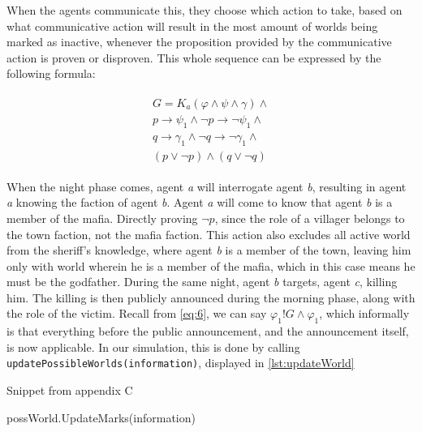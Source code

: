 When the agents communicate this, they choose which action to take, based on
what communicative action will result in the most amount of worlds being marked
as inactive, whenever the proposition provided by the communicative action is
proven or disproven. This whole sequence can be
expressed by the following formula:

\begin{align}
	\begin{split}
		G = K_a(\varphi \land \psi \land\gamma)\land                        \\
		p \rightarrow \psi_1 \land \neg p \rightarrow \neg \psi_1 \land     \\
		q \rightarrow \gamma_1 \land \neg q \rightarrow \neg \gamma_1 \land \\
		(p \lor \neg p) \land (q \lor \neg q)
		\label{eq:7}
	\end{split}
\end{align}

When the night phase comes, agent \textit{a} will interrogate agent \textit{b},
resulting in agent \textit{a} knowing the faction of agent \textit{b}. Agent
\textit{a} will come to know that agent \textit{b} is a member of the mafia.
Directly proving $\neg p$, since the role of a villager belongs to the town
faction, not the mafia faction. This action also excludes all active world from
the sheriff's knowledge, where agent \textit{b} is a member of the town,
leaving him only with world wherein he is a member of the mafia, which in this
case means he must be the godfather. During the same night, agent \textit{b}
targets, agent \textit{c}, killing him. The killing is then publicly announced
during the morning phase, along with the role of the victim. Recall from
\cref{eq:6}, we can say $\varphi_1!G\land\varphi_1$, which informally is that
everything before the public announcement, and the announcement itself, is now
applicable. In our simulation, this is done by calling
\lstinline[]{updatePossibleWorlds(information)}, displayed in
\ref{lst:updateWorld}

\begin{algorithm}[h]
	\caption{Snippet from appendix C}
	\begin{algorithmic}[1]
		\State possWorld.UpdateMarks(information)
		\EndFor
		\EndFor
		\EndFunction
	\end{algorithmic}
\end{algorithm}\label{lst:updateWorld}

